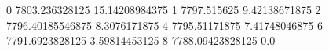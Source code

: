 0 7803.236328125 15.14208984375
1 7797.515625 9.42138671875
2 7796.40185546875 8.3076171875
4 7795.51171875 7.41748046875
6 7791.6923828125 3.59814453125
8 7788.09423828125 0.0
